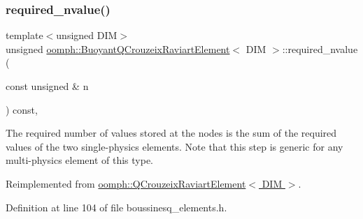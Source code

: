 \mbox{\label{classoomph_1_1BuoyantQCrouzeixRaviartElement_a64b84c9cf74a06680136d465ff9e037b}} 
\subsubsection{\texorpdfstring{required\+\_\+nvalue()}{required\_nvalue()}}
{\footnotesize\ttfamily template$<$unsigned D\+IM$>$ \\
unsigned \hyperlink{classoomph_1_1BuoyantQCrouzeixRaviartElement}{oomph\+::\+Buoyant\+Q\+Crouzeix\+Raviart\+Element}$<$ D\+IM $>$\+::required\+\_\+nvalue (\begin{DoxyParamCaption}\item[{const unsigned \&}]{n }\end{DoxyParamCaption}) const\hspace{0.3cm}{\ttfamily [inline]}, {\ttfamily [virtual]}}



The required number of values stored at the nodes is the sum of the required values of the two single-\/physics elements. Note that this step is generic for any multi-\/physics element of this type. 



Reimplemented from \hyperlink{classoomph_1_1QCrouzeixRaviartElement_a025946afee7e1ff977fb24569c438fd0}{oomph\+::\+Q\+Crouzeix\+Raviart\+Element$<$ D\+I\+M $>$}.



Definition at line 104 of file boussinesq\+\_\+elements.\+h.

\mbox{\label{classoomph_1_1BuoyantQCrouzeixRaviartElement_a26f8112d2ba9c77087e534145a2477c9}} 
